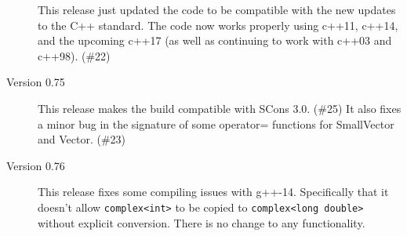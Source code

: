 \begin{description}
This release just updated the code to be compatible with the new updates to the C++ standard.
The code now works properly using c++11, c++14, and the upcoming c++17 (as well as
continuing to work with c++03 and c++98). (\#22)

\item[Version 0.75]

This release makes the build compatible with SCons 3.0. (\#25)
It also fixes a minor bug in the signature of some operator= functions for
SmallVector and Vector.  (\#23)

\item[Version 0.76]

This release fixes some compiling issues with g++-14.  Specifically that it doesn't
allow \texttt{complex<int>} to be copied to \texttt{complex<long double>} without
explicit conversion.  There is no change to any functionality.

\end{description}
